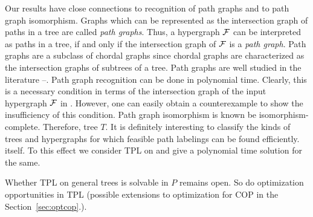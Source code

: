 \documentclass[MS,synopsis]{iitmdiss}
\begin{document}
Our results have close connections to recognition of path graphs and
to path graph isomorphism.  Graphs which can be represented as the
intersection graph of paths in a tree are called {\em path
  graphs}\cite{mcg04}. Thus, a hypergraph ${\cal F}$ can be interpreted as
paths in a tree, if and only if the intersection graph of ${\cal F}$ is a
{\em path graph}. Path graphs are a subclass of chordal graphs since
chordal graphs are characterized as the intersection graphs of
subtrees of a tree\cite{mcg04}.  Path graphs are well studied in the
literature \cite{plr70}--\cite{mcg04}.  Path graph recognition can be done in
polynomial time\cite{gav78,aas93}.  Clearly, this is a necessary
condition in terms of the intersection graph of the input hypergraph
${\cal F}$ in \FTPL. However, one can easily obtain a counterexample to
show the insufficiency of this condition.  Path graph isomorphism is known be
isomorphism-complete\cite{kklv10}. Therefore,  tree $T$.  It is
  definitely interesting to classify the kinds of trees and
  hypergraphs for which feasible path labelings can be
found efficiently.   itself.
 To this effect we consider TPL on {\kstar} and give a polynomial time
 solution for the same. 

Whether TPL on general trees is solvable in $P$ remains open. So do
optimization opportunities in TPL (possible extensions to optimization for COP in the
Section~\ref{sec:optcop}.).
\end{document}
